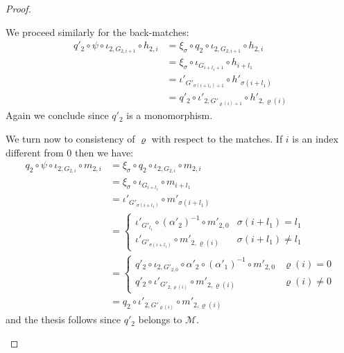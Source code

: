 \begin{proof}
\begin{enumerate}
	We proceed similarly for the back-matches:
	\begin{align*}
		q'_2\circ \psi \circ \iota_{2, G_{2,i+1}}\circ h_{2,i}&=\xi_\sigma\circ q_2\circ \iota_{2, G_{2,i+1}}\circ h_{2,i}\\&=\xi_\sigma \circ \iota_{G_{i+l_1+1}} \circ h_{i+l_1}\\&=\iota'_{G'_{\sigma(i+l_1)+1}}\circ h'_{\sigma(i+l_1)}\\&=q'_2\circ \iota'_{2, G'_{\varrho(i)+1}}\circ h'_{2, \varrho(i)}	
	\end{align*}
	Again we conclude since $q'_2$ is a monomorphism.
	
	We turn now to consistency of $\varrho$ with respect to the matches. If $i$ is an index different from $0$ then we have:
		\begin{align*}	q_2\circ \psi \circ \iota_{2, G_{2,i}}\circ m_{2,i}&=\xi_\sigma\circ q_2\circ \iota_{2, G_{2,i}}\circ m_{2,i}\\&=\xi_\sigma \circ \iota_{G_{i+l_1}} \circ m_{i+l_1}\\&=\iota'_{G'_{\sigma(i+l_1)}}\circ m'_{\sigma(i+l_1)} \\&= 
			\begin{cases}
			\iota'_{G'_{l_1}}\circ (\alpha'_2)^{-1} \circ m'_{2, 0}  &\sigma(i+l_1) = l_1\\
				\iota'_{G'_{\sigma(i+l_1)}}\circ m'_{2,\varrho(i)} & \sigma(i+l_1)\neq l_1
			\end{cases}
			\\&=\begin{cases}
			q'_2\circ \iota_{2, G'_{2,0}} \circ \alpha'_2\circ  (\alpha'_1)^{-1} \circ m'_{2, 0}& \varrho(i)=0\\
			q'_2\circ \iota'_{G'_{2, \varrho(i)}} \circ m'_{2,\varrho(i)} & \varrho(i)\neq 0
			\end{cases}\\&=q_2\circ \iota'_{2, G'_{\varrho(i)}}\circ m'_{2, \varrho(i)}
		\end{align*}
		and the thesis follows since $q'_2$ belongs to $\mathcal{M}$.
	 

\end{enumerate}
\end{proof}
